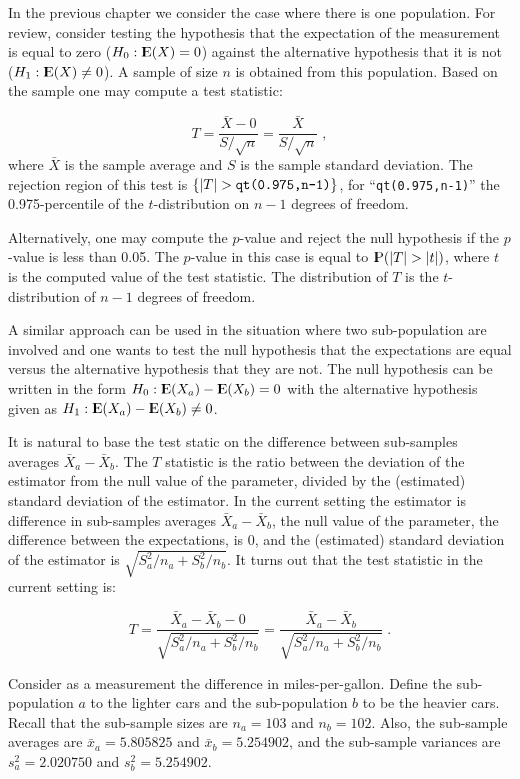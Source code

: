 \documentclass[]{krantz}
\newcommand{\Expec}{{\rm I\kern-.3em E}}
\newcommand{\Prob}{{\rm I\kern-.3em P}}
\theoremstyle{definition}
\theoremstyle{definition}
\theoremstyle{definition}
\theoremstyle{remark}
\begin{document}
In the previous chapter we consider the case where there is one
population. For review, consider testing the hypothesis that the
expectation of the measurement is equal to zero (\(H_0: \Expec(X) = 0\))
against the alternative hypothesis that it is not
(\(H_1: \Expec(X) \not = 0\)). A sample of size \(n\) is obtained from this
population. Based on the sample one may compute a test statistic:

\[T = \frac{\bar X - 0}{S/\sqrt{n}} = \frac{\bar X}{S/\sqrt{n}}\;,\]
where \(\bar X\) is the sample average and \(S\) is the sample standard
deviation. The rejection region of this test is
\(\{|T| > \mbox{\texttt{qt(0.975,n-1)}}\}\), for ``\texttt{qt(0.975,n-1)}'' the
0.975-percentile of the \(t\)-distribution on \(n-1\) degrees of freedom.

Alternatively, one may compute the \(p\)-value and reject the null
hypothesis if the \(p\)-value is less than 0.05. The \(p\)-value in this
case is equal to \(\Prob(|T| > |t|)\), where \(t\) is the computed value of
the test statistic. The distribution of \(T\) is the \(t\)-distribution of
\(n-1\) degrees of freedom.

A similar approach can be used in the situation where two sub-population
are involved and one wants to test the null hypothesis that the
expectations are equal versus the alternative hypothesis that they are
not. The null hypothesis can be written in the form
\(H_0:\Expec(X_a) - \Expec(X_b) = 0\) with the alternative hypothesis
given as \(H_1:\Expec(X_a) - \Expec(X_b) \not = 0\).

It is natural to base the test static on the difference between
sub-samples averages \(\bar X_a - \bar X_b\). The \(T\) statistic is the
ratio between the deviation of the estimator from the null value of the
parameter, divided by the (estimated) standard deviation of the
estimator. In the current setting the estimator is difference in
sub-samples averages \(\bar X_a - \bar X_b\), the null value of the
parameter, the difference between the expectations, is 0, and the
(estimated) standard deviation of the estimator is
\(\sqrt{S_a^2/n_a + S_b^2/n_b}\). It turns out that the test statistic in
the current setting is:

\[T = \frac{\bar X_a - \bar X_b - 0}{ \sqrt{S_a^2/n_a + S^2_b/n_b}} = \frac{\bar X_a - \bar X_b}{ \sqrt{S_a^2/n_a + S^2_b/n_b}}\;.\]

Consider as a measurement the difference in miles-per-gallon. Define the
sub-population \(a\) to the lighter cars and the sub-population \(b\) to be
the heavier cars. Recall that the sub-sample sizes are \(n_a =103\) and
\(n_b=102\). Also, the sub-sample averages are \(\bar x_a = 5.805825\) and
\(\bar x_b =5.254902\), and the sub-sample variances are
\(s^2_a = 2.020750\) and \(s_b^2 = 5.254902\).
\end{document}
